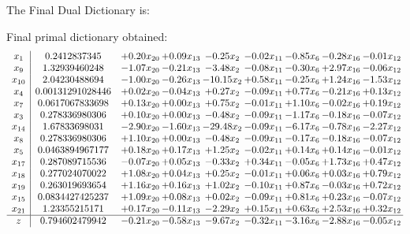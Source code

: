 \documentclass[8pt]{article}
\begin{document}
The Final Dual Dictionary is: 

 Final primal dictionary obtained: 
\[\begin{array}{c| c c@{\hskip 2pt} c@{\hskip 2pt} c@{\hskip 2pt} c@{\hskip 2pt} c@{\hskip 2pt} c@{\hskip 2pt} c@{\hskip 2pt} }
 x_{1}   &  0.2412837345 & +  0.20 x_{20} & +  0.09 x_{13} & -0.25 x_{2} & -0.02 x_{11} & -0.85 x_{6} & -0.28 x_{16} & -0.01 x_{12}\\
 x_{9}   &  1.32939460248 & -1.07 x_{20} & -0.21 x_{13} & -3.48 x_{2} & -0.08 x_{11} & -0.30 x_{6} & +  2.97 x_{16} & -0.06 x_{12}\\
 x_{10}   &  2.04230488694 & -1.00 x_{20} & -0.26 x_{13} & -10.15 x_{2} & +  0.58 x_{11} & -0.25 x_{6} & +  1.24 x_{16} & -1.53 x_{12}\\
 x_{4}   &  0.00131291028446 & +  0.02 x_{20} & -0.04 x_{13} & +  0.27 x_{2} & -0.09 x_{11} & +  0.77 x_{6} & -0.21 x_{16} & +  0.13 x_{12}\\
 x_{7}   &  0.0617067833698 & +  0.13 x_{20} & +  0.00 x_{13} & +  0.75 x_{2} & -0.01 x_{11} & +  1.10 x_{6} & -0.02 x_{16} & +  0.19 x_{12}\\
 x_{3}   &  0.278336980306 & +  0.10 x_{20} & +  0.00 x_{13} & -0.48 x_{2} & -0.09 x_{11} & -1.17 x_{6} & -0.18 x_{16} & -0.07 x_{12}\\
 x_{14}   &  1.67833698031 & -2.90 x_{20} & -1.60 x_{13} & -29.48 x_{2} & -0.09 x_{11} & -6.17 x_{6} & -0.78 x_{16} & -2.27 x_{12}\\
 x_{8}   &  0.278336980306 & +  1.10 x_{20} & +  0.00 x_{13} & -0.48 x_{2} & -0.09 x_{11} & -0.17 x_{6} & -0.18 x_{16} & -0.07 x_{12}\\
 x_{5}   &  0.0463894967177 & +  0.18 x_{20} & +  0.17 x_{13} & +  1.25 x_{2} & -0.02 x_{11} & +  0.14 x_{6} & +  0.14 x_{16} & -0.01 x_{12}\\
 x_{17}   &  0.287089715536 & -0.07 x_{20} & +  0.05 x_{13} & -0.33 x_{2} & +  0.34 x_{11} & -0.05 x_{6} & +  1.73 x_{16} & +  0.47 x_{12}\\
 x_{18}   &  0.277024070022 & +  1.08 x_{20} & +  0.04 x_{13} & +  0.25 x_{2} & -0.01 x_{11} & +  0.06 x_{6} & +  0.03 x_{16} & +  0.79 x_{12}\\
 x_{19}   &  0.263019693654 & +  1.16 x_{20} & +  0.16 x_{13} & +  1.02 x_{2} & -0.10 x_{11} & +  0.87 x_{6} & -0.03 x_{16} & +  0.72 x_{12}\\
 x_{15}   &  0.0834427425237 & +  1.09 x_{20} & +  0.08 x_{13} & +  0.02 x_{2} & -0.09 x_{11} & +  0.81 x_{6} & +  0.23 x_{16} & -0.07 x_{12}\\
 x_{21}   &  1.23355215171 & +  0.17 x_{20} & -0.11 x_{13} & -2.29 x_{2} & +  0.15 x_{11} & +  0.63 x_{6} & +  2.53 x_{16} & +  0.32 x_{12}\\
\hline
z    &  0.794602479942 & -0.21 x_{20} & -0.58 x_{13} & -9.67 x_{2} & -0.32 x_{11} & -3.16 x_{6} & -2.88 x_{16} & -0.05 x_{12}\\
\end{array}\]
\end{document}
